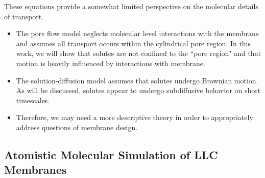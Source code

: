   These equations provide a somewhat limited perspective on the molecular details
  of transport.
  \begin{itemize}
    \item The pore flow model neglects molecular level interactions with the membrane
    and assumes all transport occurs within the cylindrical pore region. In this work, we
    will show that solutes are not confined to the ``pore region" and that motion is 
    heavily influenced by interactions with membrane.
    \item The solution-diffusion model assumes that solutes undergo Brownian motion. As will
    be discussed, solutes appear to undergo subdiffusive behavior on short
    timescales. 
    \item Therefore, we may need a more descriptive theory in order
    to appropriately address questions of membrane design.
  \end{itemize}
  
  \subsection{Atomistic Molecular Simulation of LLC Membranes}  
  
